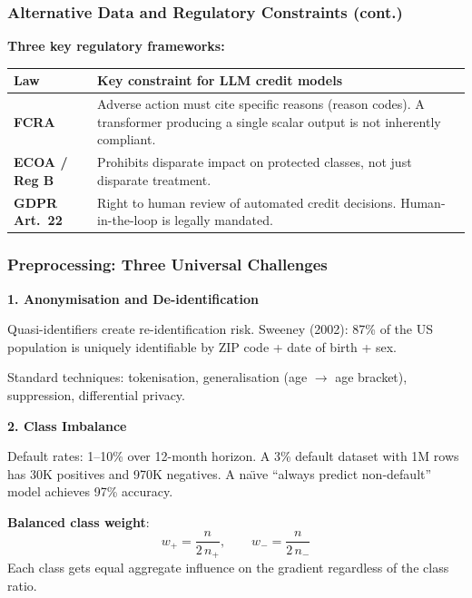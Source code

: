 \documentclass[9pt,t]{beamer}
\begin{document}
\begin{frame}
\frametitle{Alternative Data and Regulatory Constraints (cont.)}

\textbf{Three key regulatory frameworks:}
\begin{center}
\begin{tabular}{lp{6.5cm}}
\toprule
Law & Key constraint for LLM credit models \\
\midrule
\textbf{FCRA} & Adverse action must cite specific reasons (reason codes). A transformer producing a single scalar output is not inherently compliant. \\
\textbf{ECOA / Reg B} & Prohibits disparate impact on protected classes, not just disparate treatment. \\
\textbf{GDPR Art.~22} & Right to human review of automated credit decisions. Human-in-the-loop is legally mandated. \\
\bottomrule
\end{tabular}
\end{center}
\end{frame}

\begin{frame}
\frametitle{Preprocessing: Three Universal Challenges}

\textbf{1. Anonymisation and De-identification}

Quasi-identifiers create re-identification risk. Sweeney (2002): 87\% of the US population
is uniquely identifiable by ZIP code + date of birth + sex.

Standard techniques: tokenisation, generalisation (age $\to$ age bracket), suppression, differential privacy.

\medskip
\textbf{2. Class Imbalance}

Default rates: 1--10\% over 12-month horizon. A 3\% default dataset with 1M rows has 30K
positives and 970K negatives. A na\"{\i}ve ``always predict non-default'' model achieves 97\% accuracy.

\textbf{Balanced class weight}:
\[
  w_+ = \frac{n}{2\, n_+}, \qquad w_- = \frac{n}{2\, n_-}
\]
Each class gets equal aggregate influence on the gradient regardless of the class ratio.
\end{frame}
\end{document}
